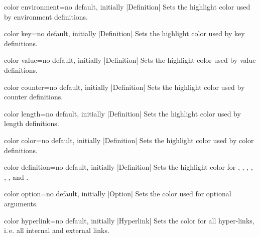 \begin{docTcbKey}{color environment}{=}{no default, initially |Definition|}
  Sets the highlight color used by environment definitions.
\end{docTcbKey}

\begin{docTcbKey}{color key}{=}{no default, initially |Definition|}
  Sets the highlight color used by key definitions.
\end{docTcbKey}

\begin{docTcbKey}{color value}{=}{no default, initially |Definition|}
  Sets the highlight color used by value definitions.
\end{docTcbKey}

\begin{docTcbKey}[][doc new={2015-01-08}]{color counter}{=}{no default, initially |Definition|}
  Sets the highlight color used by counter definitions.
\end{docTcbKey}

\begin{docTcbKey}[][doc new={2015-01-08}]{color length}{=}{no default, initially |Definition|}
  Sets the highlight color used by length definitions.
\end{docTcbKey}

\begin{docTcbKey}{color color}{=}{no default, initially |Definition|}
  Sets the highlight color used by color definitions.
\end{docTcbKey}

\begin{docTcbKey}{color definition}{=}{no default, initially |Definition|}
  Sets the highlight color for , ,
  , , ,
  , and .
\end{docTcbKey}

\begin{docTcbKey}{color option}{=}{no default, initially |Option|}
  Sets the color used for optional arguments.
\end{docTcbKey}

\begin{docTcbKey}{color hyperlink}{=}{no default, initially |Hyperlink|}
  Sets the color for all hyper-links, i.\,e. all internal and external links.
\end{docTcbKey}


